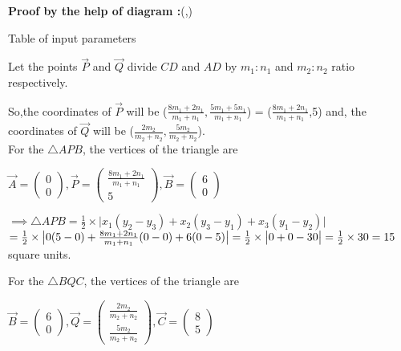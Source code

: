 \documentclass[12pt]{article}
\begin{document}
\textbf{Proof by the help of diagram :}(,)
\begin{table}[H]
	\centering
	
	\caption{Table of input parameters}
	\label{tab:tab:1}
\end{table}


Let the points $\vec{P}$ and $\Vec{Q}$ divide $CD$ and $AD$ by $m_1:n_1$ and $m_2:n_2$ ratio respectively.

So,the coordinates of $\Vec{P}$ will be ($\frac{8m_1+2n_1}{m_1+n_1},\frac{5m_1+5n_1}{m_1+n_1}$) = ($\frac{8m_1+2n_1}{m_1+n_1}$,5) and, the coordinates of $\Vec{Q}$ will be ($\frac{2m_2}{m_2+n_2},\frac{5m_2}{m_2+n_2}$).\\
For the $\triangle APB$, the vertices of the triangle are

   $\Vec{A}=\begin{pmatrix}
       0\\0
   \end{pmatrix},
   \Vec{P}=\begin{pmatrix}
       \frac{8m_1+2n_1}{m_1+n_1}\\5
   \end{pmatrix},
   \Vec{B}=\begin{pmatrix}
       6\\0
   \end{pmatrix}$

   
$\implies \triangle APB = \frac{1}{2}\times \big |x_1(y_2-y_3)+x_2(y_3-y_1)+x_3(y_1-y_2) \big|$\\
$ = \frac{1}{2} \times \big |0(5-0)+\frac{8m_1+2n_1}{m_1+n_1}(0-0)+6(0-5)\big|\\
 = \frac{1}{2} \times\big |0+0-30\big|\\
 =\frac{1}{2} \times30\\
 =15 $ square units.


 For the $\triangle BQC$, the vertices of the triangle are
 
   $\Vec{B}=\begin{pmatrix}
       6\\0
   \end{pmatrix},
   \Vec{Q}=\begin{pmatrix}
       \frac{2m_2}{m_2+n_2}\\\frac{5m_2}{m_2+n_2}
   \end{pmatrix},
   \Vec{C}=\begin{pmatrix}
       8\\5
   \end{pmatrix}$
\end{document}
